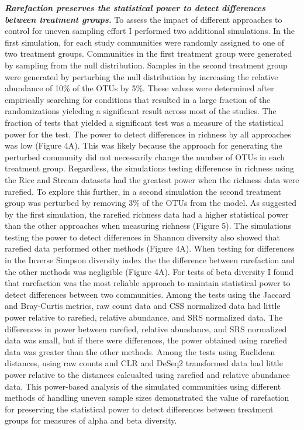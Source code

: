 \documentclass[
]{article}
\begin{document}
\textbf{\emph{Rarefaction preserves the statistical power to detect
differences between treatment groups.}} To assess the impact of
different approaches to control for uneven sampling effort I performed
two additional simulations. In the first simulation, for each study
communities were randomly assigned to one of two treatment groups.
Communities in the first treatment group were generated by sampling from
the null distribution. Samples in the second treatment group were
generated by perturbing the null distribution by increasing the relative
abundance of 10\% of the OTUs by 5\%. These values were determined after
empirically searching for conditions that resulted in a large fraction
of the randomizations yieleding a significant result across most of the
studies. The fraction of tests that yielded a significant test was a
measure of the statistical power for the test. The power to detect
differences in richness by all approaches was low (Figure 4A). This was
likely because the approach for generating the perturbed community did
not necessarily change the number of OTUs in each treatment group.
Regardless, the simulations testing differencse in richness using the
Rice and Stream datasets had the greatest power when the richness data
were rarefied. To explore this further, in a second simulation the
second treatment group was perturbed by removing 3\% of the OTUs from
the model. As suggested by the first simulation, the rarefied richness
data had a higher statistical power than the other approaches when
measuring richness (Figure 5). The simulations testing the power to
detect differences in Shannon diversity also showed that rarefied data
performed other methods (Figure 4A). When testing for differences in the
Inverse Simpson diversity index the the difference between rarefaction
and the other methods was negligible (Figure 4A). For tests of beta
diversity I found that rarefaction was the most reliable approach to
maintain statistical power to detect differences between two
communities. Among the tests using the Jaccard and Bray-Curtis metrics,
raw count data and CSS normalized data had little power relative to
rarefied, relative abundance, and SRS normalized data. The differences
in power between rarefied, relative abundance, and SRS normalized data
was small, but if there were differences, the power obtained using
rarefied data was greater than the other methods. Among the tests using
Euclidean distances, using raw counts and CLR and DeSeq2 transformed
data had little power relative to the distances calcualted using
rarefied and relative abundance data. This power-based analysis of the
simulated communities using different methods of handling uneven sample
sizes demonstrated the value of rarefaction for preserving the
statistical power to detect differences between treatment groups for
measures of alpha and beta diversity.
\end{document}
